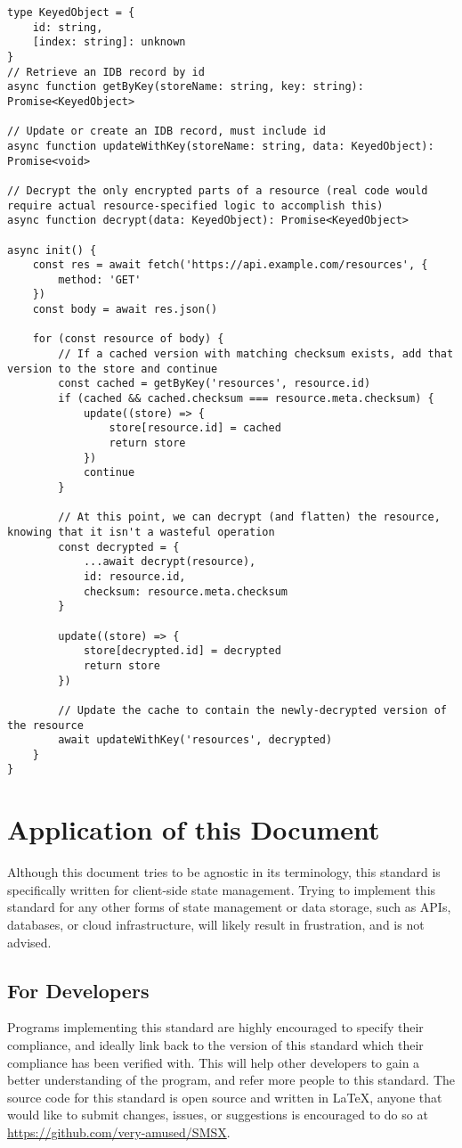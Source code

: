 \documentclass{article}
\begin{document}
\newpage
\begin{lstlisting}[caption=Retrieving Encrypted Resources]
type KeyedObject = {
    id: string,
    [index: string]: unknown
}
// Retrieve an IDB record by id
async function getByKey(storeName: string, key: string): Promise<KeyedObject>

// Update or create an IDB record, must include id
async function updateWithKey(storeName: string, data: KeyedObject): Promise<void>

// Decrypt the only encrypted parts of a resource (real code would require actual resource-specified logic to accomplish this)
async function decrypt(data: KeyedObject): Promise<KeyedObject>

async init() {
    const res = await fetch('https://api.example.com/resources', {
        method: 'GET'
    })
    const body = await res.json()
    
    for (const resource of body) {
        // If a cached version with matching checksum exists, add that version to the store and continue
        const cached = getByKey('resources', resource.id)
        if (cached && cached.checksum === resource.meta.checksum) {
            update((store) => {
                store[resource.id] = cached
                return store
            })
            continue
        }
        
        // At this point, we can decrypt (and flatten) the resource, knowing that it isn't a wasteful operation
        const decrypted = {
            ...await decrypt(resource),
            id: resource.id,
            checksum: resource.meta.checksum
        }
        
        update((store) => {
            store[decrypted.id] = decrypted
            return store
        })
        
        // Update the cache to contain the newly-decrypted version of the resource
        await updateWithKey('resources', decrypted)
    }
}
\end{lstlisting}

\newpage
\section{Application of this Document}
Although this document tries to be agnostic in its terminology, this standard is specifically written for client-side state management. Trying to implement this standard for any other forms of state management or data storage, such as APIs, databases, or cloud infrastructure, will likely result in frustration, and is not advised. 

\subsection{For Developers}
Programs implementing this standard are highly encouraged to specify their compliance, and ideally link back to the version of this standard which their compliance has been verified with. This will help other developers to gain a better understanding of the program, and refer more people to this standard. The source code for this standard is open source and written in \LaTeX{}, anyone that would like to submit changes, issues, or suggestions is encouraged to do so at \url{https://github.com/very-amused/SMSX}.
\end{document}
